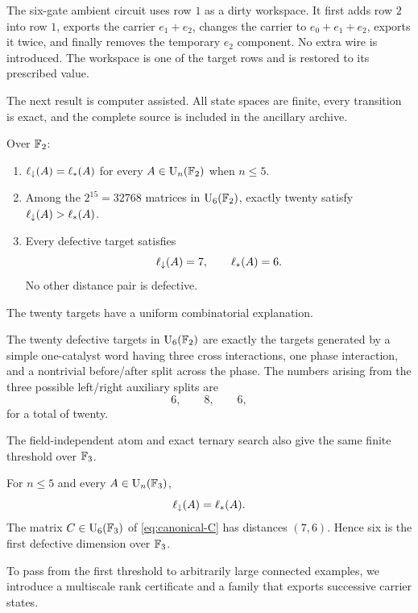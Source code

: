 The six-gate ambient circuit uses row $1$ as a dirty workspace.  It first adds row $2$ into row $1$, exports the carrier $e_1+e_2$, changes the carrier to $e_0+e_1+e_2$, exports it twice, and finally removes the temporary $e_2$ component.  No extra wire is introduced.  The workspace is one of the target rows and is restored to its prescribed value.

The next result is computer assisted.  All state spaces are finite, every transition is exact, and the complete source is included in the ancillary archive.

\begin{theorem}\label{thm:binary-census}
Over $\mathbb F_2$:
\begin{enumerate}[label=\textup{(\roman*)}]
\item $\ell_{\downarrow}(A)=\ell_{*}(A)$ for every $A\in\operatorname{U}_n(\mathbb F_2)$ when $n\le5$.
\item Among the $2^{15}=32768$ matrices in $\operatorname{U}_6(\mathbb F_2)$, exactly twenty satisfy $\ell_{\downarrow}(A)>\ell_{*}(A)$.
\item Every defective target satisfies
\[
\ell_{\downarrow}(A)=7,
\qquad
\ell_{*}(A)=6.
\]
No other distance pair is defective.
\end{enumerate}
\end{theorem}

The twenty targets have a uniform combinatorial explanation.

\begin{theorem}\label{thm:motif-classification}
The twenty defective targets in $\operatorname{U}_6(\mathbb F_2)$ are exactly the targets generated by a simple one-catalyst word having three cross interactions, one phase interaction, and a nontrivial before/after split across the phase.  The numbers arising from the three possible left/right auxiliary splits are
\[
6,
\qquad
8,
\qquad
6,
\]
for a total of twenty.
\end{theorem}

The field-independent atom and exact ternary search also give the same finite threshold over $\mathbb F_3$.

\begin{theorem}\label{thm:ternary-threshold}
For $n\le5$ and every $A\in\operatorname{U}_n(\mathbb F_3)$,
\[
\ell_{\downarrow}(A)=\ell_{*}(A).
\]
The matrix $C\in\operatorname{U}_6(\mathbb F_3)$ of \cref{eq:canonical-C} has distances $(7,6)$.  Hence six is the first defective dimension over $\mathbb F_3$.
\end{theorem}

To pass from the first threshold to arbitrarily large connected examples, we introduce a multiscale rank certificate and a family that exports successive carrier states.

